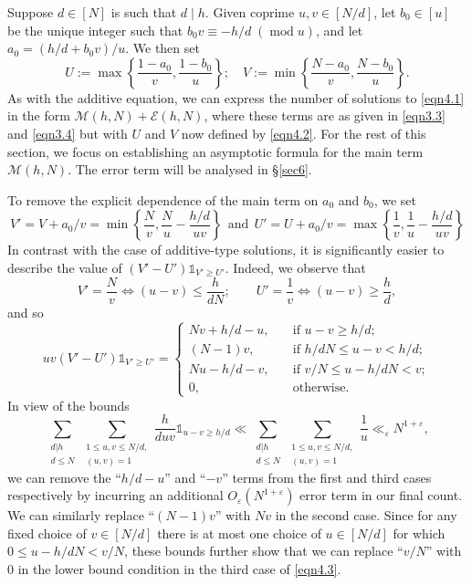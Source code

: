 \documentclass[12pt,reqno]{amsart}
\theoremstyle{definition}
\theoremstyle{remark}
\numberwithin{equation}{section}
\DeclareMathOperator{\Mod}{mod}
\newcommand{\mmod}[1]{\;(\Mod{ #1})}
\renewcommand{\geq}{\geqslant}
\renewcommand{\leq}{\leqslant}
\def\eps{\varepsilon}
\def \cE {\mathcal E}
\def \cM {\mathcal M}
\newcommand\1{\mathds{1}}
\begin{document}
Suppose $d\in[N]$ is such that $d\mid h$. Given coprime $u,v\in[N/d]$, let $b_0 \in [u]$ be the unique integer such that $b_0 v \equiv -h/d \mmod{u}$, and let $a_0 = (h/d + b_0v)/u$. We then set
\begin{equation}\label{eqn4.2}
    U :=  \max\left\{ \frac{1- a_0}{v}, \frac{1 - b_0}{u} \right\};\quad  V:=\min\left\{\frac{N- a_0}{v} ,  \frac{N- b_0}{u}\right\}.
\end{equation}
As with the additive equation, we can express the number of solutions to \eqref{eqn4.1} in the form $\cM(h,N) + \cE(h,N)$, where these terms are as given in \eqref{eqn3.3} and \eqref{eqn3.4} but with $U$ and $V$ now defined by \eqref{eqn4.2}. For the rest of this section, we focus on establishing an asymptotic formula for the main term $\cM(h,N)$. The error term will be analysed in \S\ref{sec6}.

To remove the explicit dependence of the main term on $a_0$ and $b_0$, we set 
\[ V' = V + a_0/v = \min\left\{\frac{N}{v},\frac{N}{u} - \frac{h/d}{uv}\right\} \ \ \text{and}  \ \ U' = U + a_0/v = \max\left\{\frac{1}{v}, \frac{1}{u} - \frac{h/d}{uv} \right\} \]
In contrast with the case of additive-type solutions, it is significantly easier to describe the value of $(V'-U')\1_{V'\geqslant U'}$.  Indeed, we observe that
\begin{equation*}
    V' = \frac{N}{v} \Leftrightarrow  (u-v) \leq \frac{h}{dN};\qquad 
    U' = \frac{1}{v} \Leftrightarrow  (u-v) \geq \frac{h}{d},
\end{equation*}
and so
\begin{equation}\label{eqn4.3}
    uv(V'-U')\1_{V'\geqslant U'} =
    \begin{cases}
        Nv + h/d - u, \quad&\text{if }u  - v \geqslant h/d;\\
        (N-1)v, &\text{if }h/dN \leqslant u-v < h/d;\\
        Nu - h/d - v, &\text{if } v/N \leqslant u-h/dN < v;\\
        0, &\text{otherwise.}
    \end{cases}
\end{equation}
In view of the bounds
\begin{equation*}
        \sum_{\substack{d|h \\ d \leqslant N}} \sum_{\substack{1 \leq u,v \leq N/d,\\ (u,v) = 1}}\frac{h}{duv}\1_{u-v\geqslant h/d} \ll \sum_{\substack{d|h \\ d \leqslant N}} \sum_{\substack{1 \leq u,v \leq N/d,\\ (u,v) = 1}}\frac{1}{u} \ll_\eps N^{1+\eps},
\end{equation*}
we can remove the ``$h/d-u$'' and ``$-v$'' terms from the first and third cases respectively by incurring an additional $O_\eps(N^{1+\eps})$ error term in our final count. We can similarly replace ``$(N-1)v$'' with $Nv$ in the second case. Since for any fixed choice of $v\in[N/d]$ there is at most one choice of $u\in[N/d]$ for which $0\leqslant u -h/dN<v/N$, these bounds further show that we can replace ``$v/N$'' with $0$ in the lower bound condition in the third case of \eqref{eqn4.3}.
\end{document}
